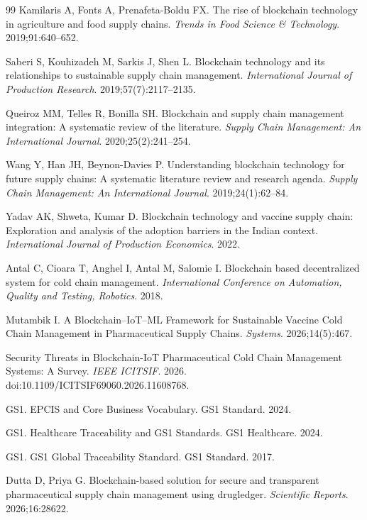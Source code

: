 \documentclass[11pt,a4paper]{article}
\begin{document}
\begin{thebibliography}{99}
Kamilaris A, Fonts A, Prenafeta-Boldu FX. The rise of blockchain technology in agriculture and food supply chains. \textit{Trends in Food Science \& Technology}. 2019;91:640--652.

Saberi S, Kouhizadeh M, Sarkis J, Shen L. Blockchain technology and its relationships to sustainable supply chain management. \textit{International Journal of Production Research}. 2019;57(7):2117--2135.

Queiroz MM, Telles R, Bonilla SH. Blockchain and supply chain management integration: A systematic review of the literature. \textit{Supply Chain Management: An International Journal}. 2020;25(2):241--254.

Wang Y, Han JH, Beynon-Davies P. Understanding blockchain technology for future supply chains: A systematic literature review and research agenda. \textit{Supply Chain Management: An International Journal}. 2019;24(1):62--84.

Yadav AK, Shweta, Kumar D. Blockchain technology and vaccine supply chain: Exploration and analysis of the adoption barriers in the Indian context. \textit{International Journal of Production Economics}. 2022.

Antal C, Cioara T, Anghel I, Antal M, Salomie I. Blockchain based decentralized system for cold chain management. \textit{International Conference on Automation, Quality and Testing, Robotics}. 2018.

Mutambik I. A Blockchain--IoT--ML Framework for Sustainable Vaccine Cold Chain Management in Pharmaceutical Supply Chains. \textit{Systems}. 2026;14(5):467.

Security Threats in Blockchain-IoT Pharmaceutical Cold Chain Management Systems: A Survey. \textit{IEEE ICITSIF}. 2026. doi:10.1109/ICITSIF69060.2026.11608768.

GS1. EPCIS and Core Business Vocabulary. GS1 Standard. 2024.

GS1. Healthcare Traceability and GS1 Standards. GS1 Healthcare. 2024.

GS1. GS1 Global Traceability Standard. GS1 Standard. 2017.

Dutta D, Priya G. Blockchain-based solution for secure and transparent pharmaceutical supply chain management using drugledger. \textit{Scientific Reports}. 2026;16:28622.


\end{thebibliography}
\end{document}
